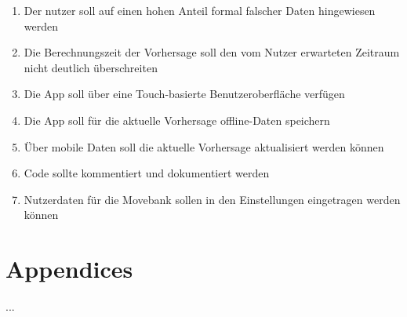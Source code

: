\documentclass[12pt]{article} %
\begin{document}
\begin{enumerate}[(R1)]
		\item Der nutzer soll auf einen hohen Anteil formal falscher Daten hingewiesen werden
		\item Die Berechnungszeit der Vorhersage soll den vom Nutzer erwarteten Zeitraum nicht deutlich überschreiten
		\item Die App soll über eine Touch-basierte Benutzeroberfläche verfügen
		\item Die App soll für die aktuelle Vorhersage offline-Daten speichern
		\item Über mobile Daten soll die aktuelle Vorhersage aktualisiert werden können
		\item Code sollte kommentiert und dokumentiert werden
		\item Nutzerdaten für die Movebank sollen in den Einstellungen eingetragen werden können	
 	\end{enumerate}
	





\section{Appendices}

...
\end{document}
